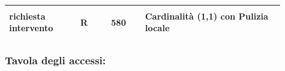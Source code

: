 \documentclass[12pt,a4paper]{article}
\begin{document}
\begin{center}
\begin{longtable}{|p{0.23\linewidth}|p{0.1\linewidth}|p{0.11\linewidth}|p{0.45\linewidth}|}
\hline
richiesta intervento 				& \begin{center}
\vspace{-25pt}R
\end{center}
					& \begin{center}
					\vspace{-25pt}580\end{center}
					&  Cardinalità (1,1) con Pulizia locale \\ 

\hline

\end{longtable}\end{center}
\subsubsection*{Tavola degli accessi:}
\end{document}
